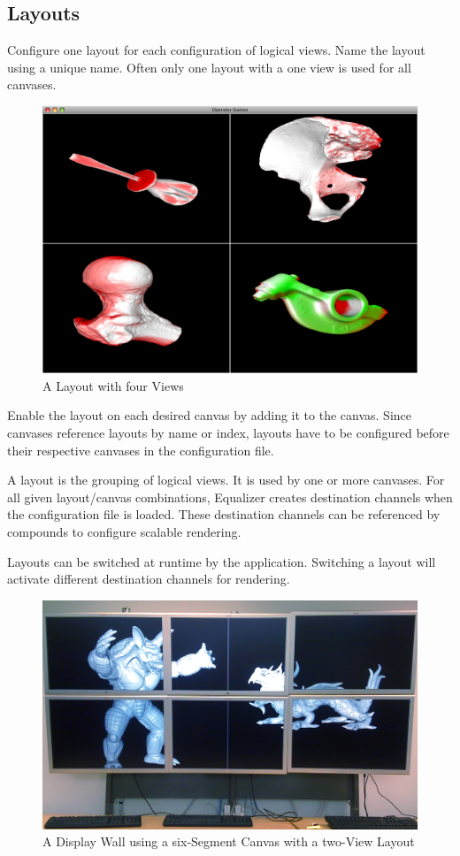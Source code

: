 \documentclass[10pt,a4]{scrartcl}
\begin{document}
\subsection{\label{sLayout}Layouts}

Configure one \textsf{layout} for each configuration of logical
views. Name the layout using a unique name. Often only one layout with a
one view is used for all canvases.

\begin{figure}
  \includegraphics[width=.382\textwidth]{images/layout.png}
  {\caption{\label{fLayout}A Layout with four Views}}
\end{figure}
Enable the layout on each desired canvas by adding it to the
canvas. Since canvases reference layouts by name or index, layouts have
to be configured before their respective canvases in the configuration
file.

A layout is the grouping of logical views. It is used by one or more
canvases. For all given layout/canvas combinations, Equalizer creates
destination channels when the configuration file is loaded. These
destination channels can be referenced by compounds to configure
scalable rendering.

Layouts can be switched at runtime by the application. Switching a
layout will activate different destination channels for rendering.

\begin{figure}[ht!]\center
  \includegraphics[width=.9\textwidth]{images/wallLayout.jpg}
  {\caption{A Display Wall using a six-Segment Canvas with a two-View Layout}}
\end{figure}
\end{document}
